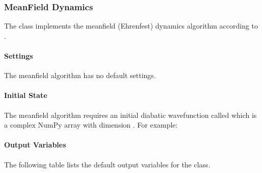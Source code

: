 \documentclass[letterpaper,10pt,english]{sphinxmanual}
\begin{document}
\sphinxstepscope


\subsubsection{Mean\sphinxhyphen{}Field Dynamics}
\label{\detokenize{user_guide/algorithms/mf_algorithm:mean-field-dynamics}}\label{\detokenize{user_guide/algorithms/mf_algorithm:mf-algorithm}}\label{\detokenize{user_guide/algorithms/mf_algorithm::doc}}
\sphinxAtStartPar
The  class implements the mean\sphinxhyphen{}field (Ehrenfest) dynamics algorithm according to .


\paragraph{Settings}
\label{\detokenize{user_guide/algorithms/mf_algorithm:settings}}
\sphinxAtStartPar
The mean\sphinxhyphen{}field algorithm has no default settings.


\paragraph{Initial State}
\label{\detokenize{user_guide/algorithms/mf_algorithm:initial-state}}
\sphinxAtStartPar
The mean\sphinxhyphen{}field algorithm requires an initial diabatic wavefunction called  which is a complex NumPy array with dimension .
For example:

\begin{sphinxVerbatim}[commandchars=\\\{\}]
  \PYG{p}{[} \PYG{p}{]} 
\end{sphinxVerbatim}


\paragraph{Output Variables}
\label{\detokenize{user_guide/algorithms/mf_algorithm:output-variables}}
\sphinxAtStartPar
The following table lists the default output variables for the  class.
\end{document}
